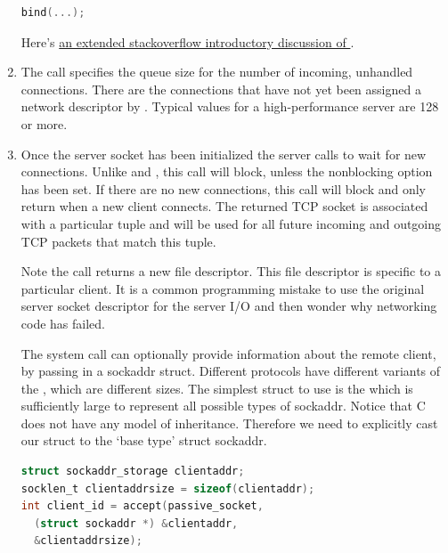 \begin{enumerate}
\begin{lstlisting}[language=C]
bind(...);
  \end{lstlisting}

  Here's \href{http://stackoverflow.com/questions/14388706/socket-options-so-reuseaddr-and-so-reuseport-how-do-they-differ-do-they-mean-t}{an extended stackoverflow introductory discussion of }.

  \item {}

    The  call specifies the queue size for the number of incoming, unhandled connections.
    There are the connections that have not yet been assigned a network descriptor by .
    Typical values for a high-performance server are 128 or more.

  \item {}

  Once the server socket has been initialized the server calls  to wait for new connections.
  Unlike   and , this call will block, unless the nonblocking option has been set.
  If there are no new connections, this call will block and only return when a new client connects.
  The returned TCP socket is associated with a particular tuple  and will be used for all future incoming and outgoing TCP packets that match this tuple.

  Note the  call returns a new file descriptor.
  This file descriptor is specific to a particular client.
  It is a common programming mistake to use the original server socket descriptor for the server I/O and then wonder why networking code has failed.

  The  system call can optionally provide information about the remote client, by passing in a sockaddr struct.
  Different protocols have different variants of the , which are different sizes.
  The simplest struct to use is the  which is sufficiently large to represent all possible types of sockaddr.
  Notice that C does not have any model of inheritance.
  Therefore we need to explicitly cast our struct to the `base type' struct sockaddr.

  \begin{lstlisting}[language=C]
struct sockaddr_storage clientaddr;
socklen_t clientaddrsize = sizeof(clientaddr);
int client_id = accept(passive_socket,
  (struct sockaddr *) &clientaddr,
  &clientaddrsize);
  \end{lstlisting}


\end{enumerate}
